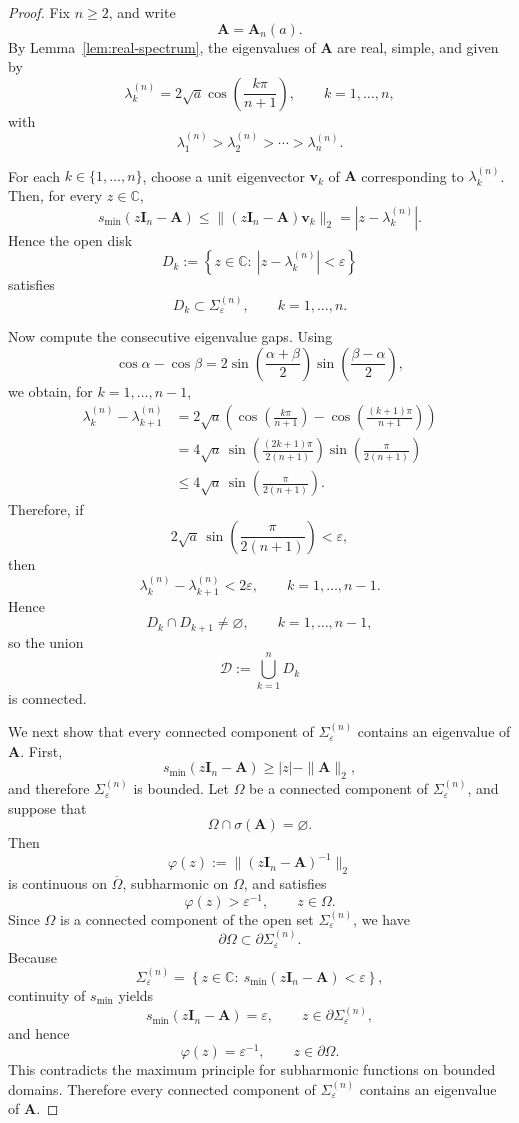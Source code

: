 \documentclass[11pt]{article}
\numberwithin{equation}{section}
\begin{document}
\begin{proof}
Fix \(n\ge2\), and write
\[
\mathbf A=\mathbf A_n(a).
\]
By Lemma~\ref{lem:real-spectrum}, the eigenvalues of \(\mathbf A\) are real, simple,
and given by
\[
\lambda_k^{(n)}=2\sqrt a\cos\!\left(\frac{k\pi}{n+1}\right),
\qquad
k=1,\dots,n,
\]
with
\[
\lambda_1^{(n)}>\lambda_2^{(n)}>\cdots>\lambda_n^{(n)}.
\]

For each \(k\in\{1,\dots,n\}\), choose a unit eigenvector \(\bm v_k\) of \(\mathbf A\)
corresponding to \(\lambda_k^{(n)}\).  Then, for every \(z\in\mathbb C\),
\[
s_{\min}(z\mathbf I_n-\mathbf A)
\le
\|(z\mathbf I_n-\mathbf A)\bm v_k\|_2
=
|z-\lambda_k^{(n)}|.
\]
Hence the open disk
\[
D_k:=\left\{z\in\mathbb C:\ |z-\lambda_k^{(n)}|<\varepsilon\right\}
\]
satisfies
\[
D_k\subset \Sigma_\varepsilon^{(n)},
\qquad k=1,\dots,n.
\]

Now compute the consecutive eigenvalue gaps.  Using
\[
\cos\alpha-\cos\beta
=
2\sin\!\left(\frac{\alpha+\beta}{2}\right)
 \sin\!\left(\frac{\beta-\alpha}{2}\right),
\]
we obtain, for \(k=1,\dots,n-1\),
\begin{align*}
\lambda_k^{(n)}-\lambda_{k+1}^{(n)}
&=
2\sqrt a
\left(
\cos\!\left(\frac{k\pi}{n+1}\right)
-
\cos\!\left(\frac{(k+1)\pi}{n+1}\right)
\right) \\
&=
4\sqrt a\,
\sin\!\left(\frac{(2k+1)\pi}{2(n+1)}\right)
\sin\!\left(\frac{\pi}{2(n+1)}\right) \\
&\le
4\sqrt a\,
\sin\!\left(\frac{\pi}{2(n+1)}\right).
\end{align*}
Therefore, if
\[
2\sqrt a\,\sin\!\left(\frac{\pi}{2(n+1)}\right)<\varepsilon,
\]
then
\[
\lambda_k^{(n)}-\lambda_{k+1}^{(n)}<2\varepsilon,
\qquad
k=1,\dots,n-1.
\]
Hence
\[
D_k\cap D_{k+1}\neq\varnothing,
\qquad
k=1,\dots,n-1,
\]
so the union
\[
\mathcal D:=\bigcup_{k=1}^n D_k
\]
is connected.

We next show that every connected component of \(\Sigma_\varepsilon^{(n)}\) contains
an eigenvalue of \(\mathbf A\).  First,
\[
s_{\min}(z\mathbf I_n-\mathbf A)\ge |z|-\|\mathbf A\|_2,
\]
and therefore \(\Sigma_\varepsilon^{(n)}\) is bounded.  Let \(\Omega\) be a connected
component of \(\Sigma_\varepsilon^{(n)}\), and suppose that
\[
\Omega\cap\sigma(\mathbf A)=\varnothing.
\]
Then
\[
\varphi(z):=\|(z\mathbf I_n-\mathbf A)^{-1}\|_2
\]
is continuous on \(\overline{\Omega}\), subharmonic on \(\Omega\), and satisfies
\[
\varphi(z)>\varepsilon^{-1},
\qquad
z\in\Omega.
\]
Since \(\Omega\) is a connected component of the open set \(\Sigma_\varepsilon^{(n)}\),
we have
\[
\partial\Omega\subset\partial\Sigma_\varepsilon^{(n)}.
\]
Because
\[
\Sigma_\varepsilon^{(n)}
=
\left\{
z\in\mathbb C:\ s_{\min}(z\mathbf I_n-\mathbf A)<\varepsilon
\right\},
\]
continuity of \(s_{\min}\) yields
\[
s_{\min}(z\mathbf I_n-\mathbf A)=\varepsilon,
\qquad
z\in\partial\Sigma_\varepsilon^{(n)},
\]
and hence
\[
\varphi(z)=\varepsilon^{-1},
\qquad
z\in\partial\Omega.
\]
This contradicts the maximum principle for subharmonic functions on bounded
domains.  Therefore every connected component of \(\Sigma_\varepsilon^{(n)}\)
contains an eigenvalue of \(\mathbf A\).


\end{proof}
\end{document}
